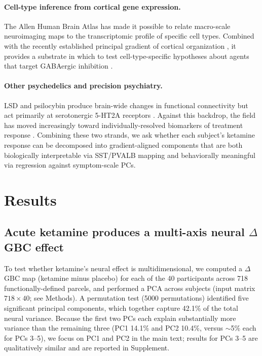 \documentclass[11pt]{article}
\begin{document}
\paragraph{Cell-type inference from cortical gene expression.} The Allen
Human Brain Atlas \citep{hawrylycz2012anatomically} has made it possible to
relate macro-scale neuroimaging maps to the transcriptomic profile of
specific cell types. Combined with the recently established principal
gradient of cortical organization \citep{margulies2016situating,burt2018hierarchy},
it provides a substrate in which to test cell-type-specific hypotheses about
agents that target GABAergic inhibition
\citep{rudy2011three,tremblay2016gabaergic}.

\paragraph{Other psychedelics and precision psychiatry.} LSD and psilocybin
produce brain-wide changes in functional connectivity but act primarily at
serotonergic 5-HT2A receptors
\citep{carhart2016neural,preller2020psilocybin,preller2018effective}. Against
this backdrop, the field has moved increasingly toward individually-resolved
biomarkers of treatment response \citep{insel2014rdoc,drysdale2017resting}.
Combining these two strands, we ask whether each subject's ketamine response
can be decomposed into gradient-aligned components that are both biologically
interpretable via SST/PVALB mapping and behaviorally meaningful via
regression against symptom-scale PCs.

\section{Results}

\subsection{Acute ketamine produces a multi-axis neural $\Delta$GBC effect}

To test whether ketamine's neural effect is multidimensional, we computed a
$\Delta$GBC map (ketamine minus placebo) for each of the 40 participants
across 718 functionally-defined parcels, and performed a PCA across subjects
(input matrix $718 \times 40$; see Methods). A permutation test (5000
permutations) identified five significant principal components, which
together capture 42.1\% of the total neural variance. Because the first two
PCs each explain substantially more variance than the remaining three (PC1
14.1\% and PC2 10.4\%, versus $\sim$5\% each for PCs 3--5), we focus on
PC1 and PC2 in the main text; results for PCs 3--5 are qualitatively
similar and are reported in Supplement.
\end{document}
